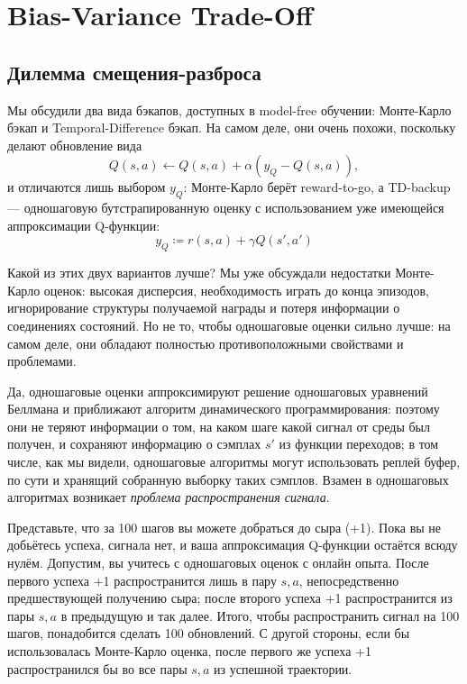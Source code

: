 \section{Bias-Variance Trade-Off}\label{sec:biasvar}

\subsection{Дилемма смещения-разброса}

Мы обсудили два вида бэкапов, доступных в model-free обучении: Монте-Карло бэкап и Temporal-Difference бэкап. На самом деле, они очень похожи, поскольку делают обновление вида
\begin{equation*}
Q(s, a) \leftarrow Q(s, a) + \alpha \left( y_Q - Q(s, a) \right),
\end{equation*}
и отличаются лишь выбором $y_Q$: Монте-Карло берёт reward-to-go, а TD-backup --- одношаговую бутстрапированную оценку с использованием уже имеющейся аппроксимации Q-функции:
$$y_Q \coloneqq r(s, a) + \gamma Q(s', a')$$

Какой из этих двух вариантов лучше? Мы уже обсуждали недостатки Монте-Карло оценок: высокая дисперсия, необходимость играть до конца эпизодов, игнорирование структуры получаемой награды и потеря информации о соединениях состояний. Но не то, чтобы одношаговые оценки сильно лучше: на самом деле, они обладают полностью противоположными свойствами и проблемами. 

Да, одношаговые оценки аппроксимируют решение одношаговых уравнений Беллмана и приближают алгоритм динамического программирования: поэтому они не теряют информации о том, на каком шаге какой сигнал от среды был получен, и сохраняют информацию о сэмплах $s'$ из функции переходов; в том числе, как мы видели, одношаговые алгоритмы могут использовать реплей буфер, по сути и хранящий собранную выборку таких сэмплов. Взамен в одношаговых алгоритмах возникает \emph{проблема распространения сигнала}.

\begin{example}
Представьте, что за 100 шагов вы можете добраться до сыра (+1). Пока вы не добьётесь успеха, сигнала нет, и ваша аппроксимация Q-функции остаётся всюду нулём. Допустим, вы учитесь с одношаговых оценок с онлайн опыта. После первого успеха +1 распространится лишь в пару $s, a$, непосредственно предшествующей получению сыра; после второго успеха +1 распространится из пары $s, a$ в предыдущую и так далее. Итого, чтобы распространить сигнал на 100 шагов, понадобится сделать 100 обновлений. С другой стороны, если бы использовалась Монте-Карло оценка, после первого же успеха +1 распространился бы во все пары $s, a$ из успешной траектории.
\end{example}

